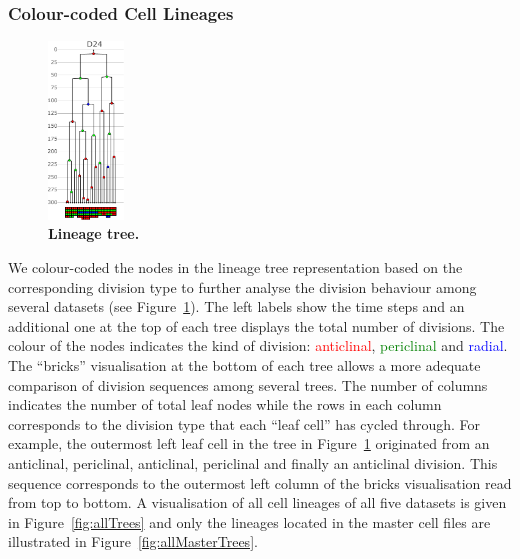 \documentclass[11pt,a4paper, draft]{article}
\begin{document}
\subsubsection{Colour-coded Cell Lineages}
\noindent
%
\begin{figure}
\vspace{-20pt}
	\begin{center}
	\includegraphics[width=0.18\textwidth]{images/cellLineage.pdf}
	\end{center}
\vspace{-20pt}
\caption[Colour-coded lineage tree.]{\bf Lineage tree.}
\vspace{-10pt}
\label{fig:cellLineage}
\end{figure}
%
We colour-coded the nodes in the lineage tree representation based on the corresponding division type to further analyse the division behaviour among several datasets (see Figure~\ref{fig:cellLineage}). The left labels show the time steps and an additional one at the top of each tree displays the total number of divisions. The colour of the nodes indicates the kind of division: \textcolor{red}{anticlinal}, \textcolor{green}{periclinal} and \textcolor{blue}{radial}. The ``bricks'' visualisation at the bottom of each tree allows a more adequate comparison of division sequences among several trees. The number of columns indicates the number of total leaf nodes while the rows in each column corresponds to the division type that each ``leaf cell'' has cycled through. For example, the outermost left leaf cell in the tree in Figure~\ref{fig:cellLineage} originated from an anticlinal, periclinal, anticlinal, periclinal and finally an anticlinal division. This sequence corresponds to the outermost left column of the bricks visualisation read from top to bottom. A visualisation of all cell lineages of all five datasets is given in Figure~\ref{fig:allTrees} and only the lineages located in the master cell files are illustrated in Figure~\ref{fig:allMasterTrees}.
\end{document}
